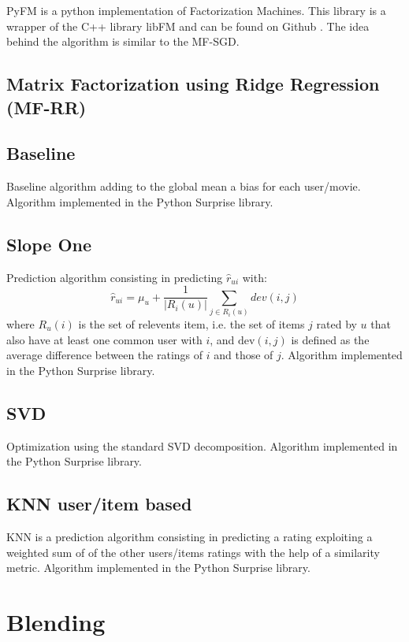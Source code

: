 \documentclass[10pt,conference,compsocconf]{IEEEtran}
\begin{document}
PyFM is a python implementation of Factorization Machines. This library is a wrapper of the C++ library libFM \cite{rendle:tist2012} and can be found on Github \cite{pyfm}. The idea behind the algorithm is similar to the MF-SGD. 

\subsection{Matrix Factorization using Ridge Regression (MF-RR)}

\subsection{Baseline}
Baseline algorithm adding to the global mean a bias for each user/movie. Algorithm implemented in the
Python Surprise library. \cite{library:surprise}


\subsection{Slope One}
Prediction algorithm consisting in predicting $\hat r_{ui}$ with:
$$ \hat r_{ui}=\mu_u + \frac{1}{|R_i(u)|}\sum_{j\in R_i(u)} dev(i,j)$$
where $R_u(i)$ is the set of relevents item, i.e. the set of items $j$ rated by $u$ that also have
at least one common user with $i$, and $\text{dev}(i,j)$ is defined as the average difference
between the ratings of $i$ and those of $j$. Algorithm implemented in the Python Surprise library.
\cite{library:surprise}

\subsection{SVD}
Optimization using the standard SVD decomposition. Algorithm implemented in the Python Surprise library. \cite{library:surprise}

\subsection{KNN user/item based}
KNN is a prediction algorithm consisting in predicting a rating exploiting a weighted sum of 
of the other users/items ratings with the help of a similarity metric. Algorithm implemented in the Python Surprise library. \cite{library:surprise}


\section{Blending}
\label{sec:blending}
\end{document}

